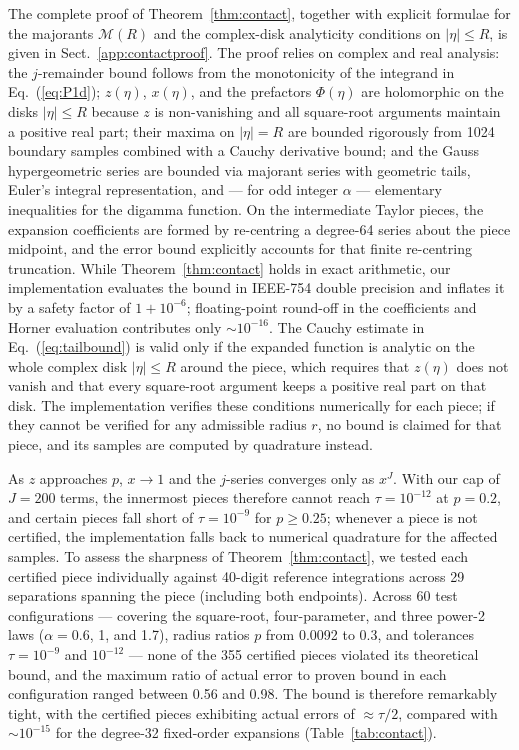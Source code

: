 \documentclass[11pt]{article}
\begin{document}
The complete proof of Theorem~\ref{thm:contact}, together with explicit formulae for the majorants $\mathcal M(R)$ and the complex-disk analyticity conditions on $|\eta|\le R$, is given in Sect.~\ref{app:contactproof}. The proof relies on complex and real analysis: the $j$-remainder bound follows from the monotonicity of the integrand in Eq.~(\ref{eq:P1d}); $z(\eta)$, $x(\eta)$, and the prefactors $\Phi(\eta)$ are holomorphic on the disks $|\eta|\le R$ because $z$ is non-vanishing and all square-root arguments maintain a positive real part; their maxima on $|\eta|=R$ are bounded rigorously from 1024 boundary samples combined with a Cauchy derivative bound; and the Gauss hypergeometric series are bounded via majorant series with geometric tails, Euler's integral representation, and --- for odd integer $\alpha$ --- elementary inequalities for the digamma function. On the intermediate Taylor pieces, the expansion coefficients are formed by re-centring a degree-64 series about the piece midpoint, and the error bound explicitly accounts for that finite re-centring truncation. While Theorem~\ref{thm:contact} holds in exact arithmetic, our implementation evaluates the bound in IEEE-754 double precision and inflates it by a safety factor of $1+10^{-6}$; floating-point round-off in the coefficients and Horner evaluation contributes only $\sim 10^{-16}$. The Cauchy estimate in Eq.~(\ref{eq:tailbound}) is valid only if the expanded function is analytic on the whole complex disk $|\eta|\le R$ around the piece, which requires that $z(\eta)$ does not vanish and that every square-root argument keeps a positive real part on that disk. The implementation verifies these conditions numerically for each piece; if they cannot be verified for any admissible radius $r$, no bound is claimed for that piece, and its samples are computed by quadrature instead.

As $z$ approaches $p$, $x\to 1$ and the $j$-series converges only as $x^J$. With our cap of $J=200$ terms, the innermost pieces therefore cannot reach $\tau=10^{-12}$ at $p=0.2$, and certain pieces fall short of $\tau=10^{-9}$ for $p\ge0.25$; whenever a piece is not certified, the implementation falls back to numerical quadrature for the affected samples. To assess the sharpness of Theorem~\ref{thm:contact}, we tested each certified piece individually against 40-digit reference integrations across 29 separations spanning the piece (including both endpoints). Across 60 test configurations --- covering the square-root, four-parameter, and three power-2 laws ($\alpha=0.6$, 1, and 1.7), radius ratios $p$ from 0.0092 to 0.3, and tolerances $\tau=10^{-9}$ and $10^{-12}$ --- none of the 355 certified pieces violated its theoretical bound, and the maximum ratio of actual error to proven bound in each configuration ranged between 0.56 and 0.98. The bound is therefore remarkably tight, with the certified pieces exhibiting actual errors of $\approx \tau/2$, compared with $\sim 10^{-15}$ for the degree-32 fixed-order expansions (Table~\ref{tab:contact}).
\end{document}
